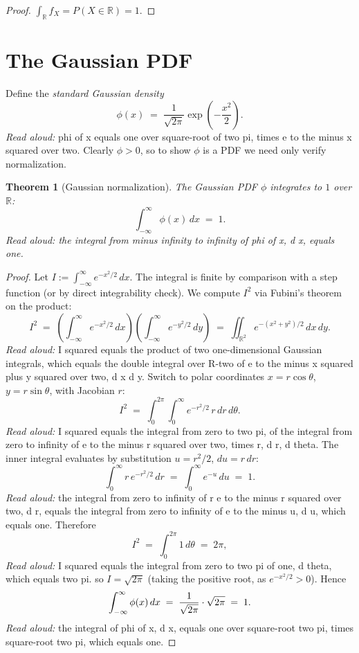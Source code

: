 \documentclass[11pt]{article}
\newtheorem{theorem}{Theorem}
\begin{document}
\begin{proof}
$\int_\mathbb{R} f_X = P(X \in \mathbb{R}) = 1$.
\end{proof}

\section{The Gaussian PDF}

Define the \emph{standard Gaussian density}
\[
    \phi(x) \;=\; \frac{1}{\sqrt{2\pi}} \exp\!\left(-\frac{x^2}{2}\right).
\]
\emph{Read aloud:} phi of x equals one over square-root of two pi, times e to the minus x squared over two.
Clearly $\phi > 0$, so to show $\phi$ is a PDF we need only verify normalization.

\begin{theorem}[Gaussian normalization]
\label{thm:gauss}
The Gaussian PDF $\phi$ integrates to $1$ over $\mathbb{R}$:
\[
    \int_{-\infty}^{\infty} \phi(x)\,dx \;=\; 1.
\]
\emph{Read aloud:} the integral from minus infinity to infinity of phi of x, d x, equals one.
\end{theorem}

\begin{proof}
Let $I := \int_{-\infty}^{\infty} e^{-x^2/2}\,dx$. The integral is finite by comparison with a step function (or by direct integrability check). We compute $I^2$ via Fubini's theorem on the product:
\[
    I^2 \;=\; \left(\int_{-\infty}^{\infty} e^{-x^2/2}\,dx\right)\!\left(\int_{-\infty}^{\infty} e^{-y^2/2}\,dy\right)
    \;=\; \iint_{\mathbb{R}^2} e^{-(x^2 + y^2)/2}\,dx\,dy.
\]
\emph{Read aloud:} I squared equals the product of two one-dimensional Gaussian integrals, which equals the double integral over R-two of e to the minus x squared plus y squared over two, d x d y.
Switch to polar coordinates $x = r\cos\theta$, $y = r\sin\theta$, with Jacobian $r$:
\[
    I^2 \;=\; \int_{0}^{2\pi}\!\int_{0}^{\infty} e^{-r^2/2}\,r\,dr\,d\theta.
\]
\emph{Read aloud:} I squared equals the integral from zero to two pi, of the integral from zero to infinity of e to the minus r squared over two, times r, d r, d theta.
The inner integral evaluates by substitution $u = r^2/2$, $du = r\,dr$:
\[
    \int_{0}^{\infty} r\,e^{-r^2/2}\,dr \;=\; \int_{0}^{\infty} e^{-u}\,du \;=\; 1.
\]
\emph{Read aloud:} the integral from zero to infinity of r e to the minus r squared over two, d r, equals the integral from zero to infinity of e to the minus u, d u, which equals one.
Therefore
\[
    I^2 \;=\; \int_{0}^{2\pi} 1\,d\theta \;=\; 2\pi,
\]
\emph{Read aloud:} I squared equals the integral from zero to two pi of one, d theta, which equals two pi.
so $I = \sqrt{2\pi}$ (taking the positive root, as $e^{-x^2/2} > 0$). Hence
\[
    \int_{-\infty}^{\infty} \phi(x)\,dx \;=\; \frac{1}{\sqrt{2\pi}} \cdot \sqrt{2\pi} \;=\; 1. \qedhere
\]
\emph{Read aloud:} the integral of phi of x, d x, equals one over square-root two pi, times square-root two pi, which equals one.
\end{proof}
\end{document}
